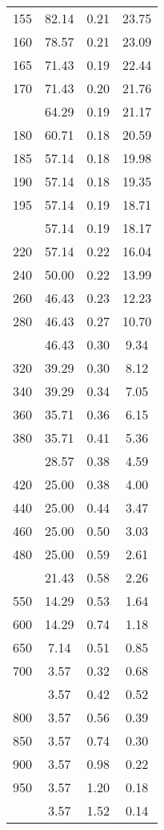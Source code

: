 \begin{table}[ht]
\begin{tabular}{lccc}
  155 & 82.14 & 0.21 & 23.75 \\ 
  160 & 78.57 & 0.21 & 23.09 \\ 
  165 & 71.43 & 0.19 & 22.44 \\ 
  170 & 71.43 & 0.20 & 21.76 \\ 
   \addlinespace
175 & 64.29 & 0.19 & 21.17 \\ 
  180 & 60.71 & 0.18 & 20.59 \\ 
  185 & 57.14 & 0.18 & 19.98 \\ 
  190 & 57.14 & 0.18 & 19.35 \\ 
  195 & 57.14 & 0.19 & 18.71 \\ 
   \addlinespace
200 & 57.14 & 0.19 & 18.17 \\ 
  220 & 57.14 & 0.22 & 16.04 \\ 
  240 & 50.00 & 0.22 & 13.99 \\ 
  260 & 46.43 & 0.23 & 12.23 \\ 
  280 & 46.43 & 0.27 & 10.70 \\ 
   \addlinespace
300 & 46.43 & 0.30 & 9.34 \\ 
  320 & 39.29 & 0.30 & 8.12 \\ 
  340 & 39.29 & 0.34 & 7.05 \\ 
  360 & 35.71 & 0.36 & 6.15 \\ 
  380 & 35.71 & 0.41 & 5.36 \\ 
   \addlinespace
400 & 28.57 & 0.38 & 4.59 \\ 
  420 & 25.00 & 0.38 & 4.00 \\ 
  440 & 25.00 & 0.44 & 3.47 \\ 
  460 & 25.00 & 0.50 & 3.03 \\ 
  480 & 25.00 & 0.59 & 2.61 \\ 
   \addlinespace
500 & 21.43 & 0.58 & 2.26 \\ 
  550 & 14.29 & 0.53 & 1.64 \\ 
  600 & 14.29 & 0.74 & 1.18 \\ 
  650 & 7.14 & 0.51 & 0.85 \\ 
  700 & 3.57 & 0.32 & 0.68 \\ 
   \addlinespace
750 & 3.57 & 0.42 & 0.52 \\ 
  800 & 3.57 & 0.56 & 0.39 \\ 
  850 & 3.57 & 0.74 & 0.30 \\ 
  900 & 3.57 & 0.98 & 0.22 \\ 
  950 & 3.57 & 1.20 & 0.18 \\ 
   \addlinespace
1000 & 3.57 & 1.52 & 0.14 \\ 
   \bottomrule
\end{tabular}
\end{table}
